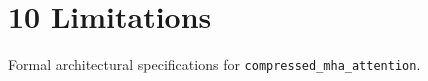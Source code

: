 \section{10 Limitations}

Formal architectural specifications for \texttt{compressed_mha_attention}.
